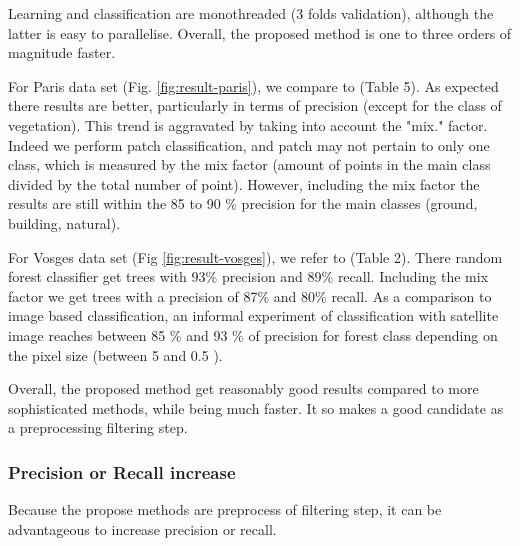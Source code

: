 		  
		  Learning and classification are monothreaded (3 folds validation), although the latter is easy to parallelise.
		  Overall, the proposed method is one to three orders of magnitude faster.
		  
		  For Paris data set (Fig. \ref{fig:result-paris}), we compare to \cite{Weinmann2015}(Table 5). As expected there results are better, particularly in terms of precision (except for the class of vegetation). This trend is aggravated by taking into account the "mix." factor.
		  Indeed we perform patch classification, and patch may not pertain to only one class, which is measured by the mix factor (amount of points in the main class divided by the total number of point).
		  However, including the mix factor the results are still within the 85 to 90 \% precision for the main classes (ground, building, natural).
		  
		  For Vosges data set (Fig \ref{fig:result-vosges}), we refer to \cite{shapovalov2010} (Table 2). There random forest classifier get trees with 93\% precision and  89\% recall.
		  Including the mix factor we get trees with a precision of 87\% and 80\% recall.
		  As a comparison to image based classification, an informal experiment of classification with satellite image reaches between 85 \% and 93 \% of precision for forest class depending on the pixel size (between 5 and 0.5 \metre).
		  
		  Overall, the proposed method get reasonably good results compared to more sophisticated methods,
		  while being much faster.
		  It so makes a good candidate as a preprocessing filtering step.
		  
	 \subsubsection{Precision or Recall increase}
	 Because the propose methods are preprocess of filtering step, it can be advantageous to increase precision or recall.
		
